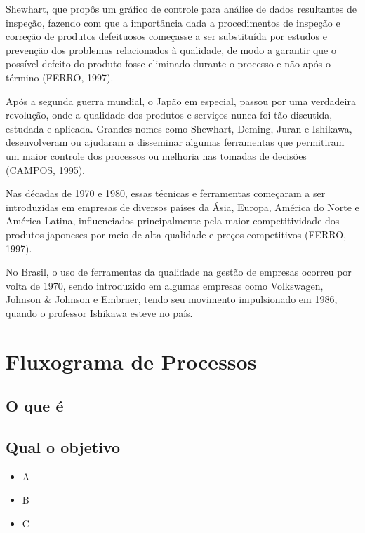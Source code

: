 \documentclass[
]{article}
\providecommand{\tightlist}{%
  \setlength{\itemsep}{0pt}\setlength{\parskip}{0pt}}
\begin{document}
Shewhart, que propôs um gráfico de controle para análise de dados resultantes de inspeção, fazendo com que a importância dada a procedimentos de inspeção e correção de produtos defeituosos começasse a ser substituída por estudos e prevenção dos problemas relacionados à qualidade, de modo a garantir que o possível defeito do produto fosse eliminado durante o processo e não após o término (FERRO, 1997).

Após a segunda guerra mundial, o Japão em especial, passou por uma verdadeira revolução, onde a qualidade dos produtos e serviços nunca foi tão discutida, estudada e aplicada. Grandes nomes como Shewhart, Deming, Juran e Ishikawa, desenvolveram ou ajudaram a disseminar algumas ferramentas que permitiram um maior controle dos processos ou melhoria nas tomadas de decisões (CAMPOS, 1995).

Nas décadas de 1970 e 1980, essas técnicas e ferramentas começaram a ser introduzidas em empresas de diversos países da Ásia, Europa, América do Norte e América Latina, influenciados principalmente pela maior competitividade dos produtos japoneses por meio de alta qualidade e preços competitivos (FERRO, 1997).

No Brasil, o uso de ferramentas da qualidade na gestão de empresas ocorreu por volta de 1970, sendo introduzido em algumas empresas como Volkswagen, Johnson \& Johnson e Embraer, tendo seu movimento impulsionado em 1986, quando o professor Ishikawa esteve no país.

\hypertarget{fluxograma-de-processos}{%
\section{Fluxograma de Processos}\label{fluxograma-de-processos}}

\hypertarget{o-que-uxe9}{%
\subsection*{O que é}\label{o-que-uxe9}}

\hypertarget{qual-o-objetivo}{%
\subsection*{Qual o objetivo}\label{qual-o-objetivo}}

\begin{itemize}
\tightlist
\item
  A
\item
  B
\item
  C
\end{itemize}
\end{document}
